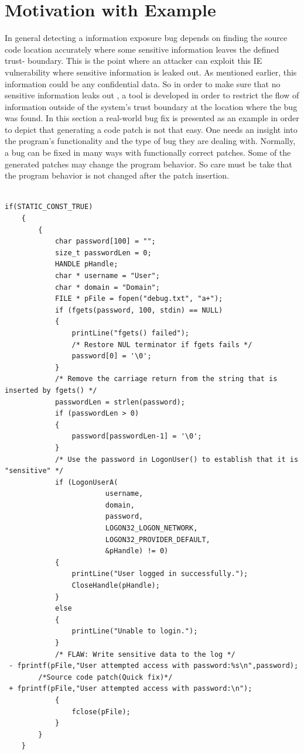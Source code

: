  \section{Motivation with Example}

 
 In general detecting a information exposure bug depends on finding the
 source code location accurately where some sensitive information leaves the defined trust- boundary. This is the point where an attacker can exploit this IE vulnerability
 where sensitive information is leaked out. As  mentioned earlier, this information could be any confidential data. So in order to make sure that
 no sensitive information leaks out , a tool is developed in order to restrict the flow of information outside of the system's trust boundary at the location where the bug
 was found. In this section a real-world bug fix is presented as an example in
 order to depict that generating a code patch is not that easy.
 One needs an insight into the program's functionality and the type 
 of bug they are dealing with. Normally, a bug can be fixed in many ways with functionally correct patches.
 Some of the generated patches may change the program behavior. So care must be take that the program behavior is not changed after the patch insertion.

\begin{lstlisting}[caption={CWE-534 test programs source},label={lst:CWE534}]

if(STATIC_CONST_TRUE)
    {
        {
            char password[100] = "";
            size_t passwordLen = 0;
            HANDLE pHandle;
            char * username = "User";
            char * domain = "Domain";
            FILE * pFile = fopen("debug.txt", "a+");
            if (fgets(password, 100, stdin) == NULL)
            {
                printLine("fgets() failed");
                /* Restore NUL terminator if fgets fails */
                password[0] = '\0';
            }
            /* Remove the carriage return from the string that is inserted by fgets() */
            passwordLen = strlen(password);
            if (passwordLen > 0)
            {
                password[passwordLen-1] = '\0';
            }
            /* Use the password in LogonUser() to establish that it is "sensitive" */
            if (LogonUserA(
                        username,
                        domain,
                        password,
                        LOGON32_LOGON_NETWORK,
                        LOGON32_PROVIDER_DEFAULT,
                        &pHandle) != 0)
            {
                printLine("User logged in successfully.");
                CloseHandle(pHandle);
            }
            else
            {
                printLine("Unable to login.");
            }
            /* FLAW: Write sensitive data to the log */
 - fprintf(pFile,"User attempted access with password:%s\n",password);
        /*Source code patch(Quick fix)*/
 + fprintf(pFile,"User attempted access with password:\n");
            {
                fclose(pFile);
            }
        }
    }
\end{lstlisting}


